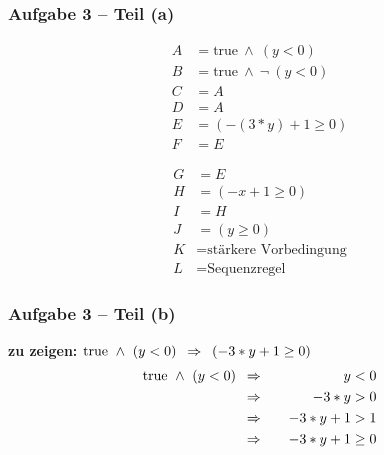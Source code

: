 \documentclass{beamer}
\newcommand{\logand}{ \ \land \ }
\begin{document}
\begin{frame} \frametitle{Aufgabe 3 -- Teil (a)}
	\begin{minipage}{\dimexpr0.5\linewidth-\fboxrule-\fboxsep}
		\begin{align*}
			A &= \text{true} \logand (y < 0) \\
			B &= \text{true} \logand \lnot \ (y < 0) \\
			C &= A \\
			D &= A \\
			E &= ( -(3*y) + 1 \ge 0) \\
			F &= E 
		\end{align*}
	\end{minipage}
	\begin{minipage}{\dimexpr0.5\linewidth-\fboxrule-\fboxsep}
		\begin{align*}
		G &= E \\
		H &= (-x + 1 \ge 0) \\
		I &= H \\
		J &= (y \ge 0) \\
		K &= \text{stärkere Vorbedingung} \\
		L &= \text{Sequenzregel} 
		\end{align*}
	\end{minipage}	
\end{frame}

\begin{frame}[t] \frametitle{Aufgabe 3 -- Teil (b)}
	\begin{center}
		\textbf{zu zeigen:} $\text{true} \ \land \ (y < 0) \enskip \Rightarrow \enskip (-3 * y + 1 \ge 0)$
		\pause
		\begin{alignat*}{2}
			\text{true} \ \land \ (y < 0) \enskip &\Rightarrow \quad &y &< 0 \\
			&\Rightarrow \quad &-3 * y &> 0 \\ 
			&\Rightarrow \quad &-3 * y + 1 &> 1 \\ 
			&\Rightarrow \quad &-3 * y + 1 &\ge 0 
		\end{alignat*}
	\end{center}
\end{frame}
\end{document}
